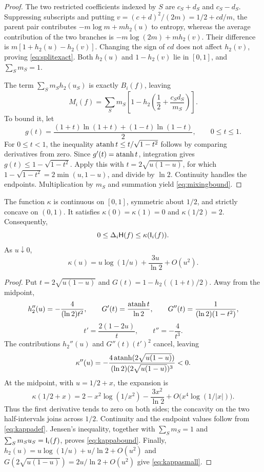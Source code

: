 \begin{proof}
The two restricted coefficients indexed by $S$ are $c_S+d_S$ and
$c_S-d_S$. Suppressing subscripts and putting
$v=(c+d)^2/(2m)=1/2+cd/m$, the parent pair contributes
$-m\log m+mh_2(u)$ to entropy, whereas the average contribution
of the two branches is $-m\log(2m)+mh_2(v)$.
Their difference is $m[1+h_2(u)-h_2(v)]$.
Changing the sign of $cd$ does not affect $h_2(v)$, proving
\eqref{eq:splitexact}. Both $h_2(u)$ and $1-h_2(v)$ lie in $[0,1]$,
and $\sum_Sm_S=1$.

The term $\sum_Sm_Sh_2(u_S)$ is exactly $B_i(f)$, leaving
\[
 M_i(f)=\sum_Sm_S
 \left[1-h_2\!\left(\frac12+\frac{c_Sd_S}{m_S}\right)\right].
\]
To bound it, let
\[
 g(t)=\frac{(1+t)\ln(1+t)+(1-t)\ln(1-t)}2,
 \qquad 0\le t\le1.
\]
For $0\le t<1$, the inequality
$\operatorname{atanh} t\le t/\sqrt{1-t^2}$ follows by comparing derivatives
from zero. Since $g'(t)=\operatorname{atanh} t$, integration gives
$g(t)\le1-\sqrt{1-t^2}$. Apply this with
$t=2\sqrt{u(1-u)}$, for which
$1-\sqrt{1-t^2}=2\min(u,1-u)$, and divide by $\ln2$.
Continuity handles the endpoints. Multiplication by $m_S$ and
summation yield \eqref{eq:mixingbound}.
\end{proof}

\begin{lemma}\label{lem:kappaconcavity}
The function $\kappa$ is continuous on $[0,1]$, symmetric about
$1/2$, and strictly concave on $(0,1)$. It satisfies
$\kappa(0)=\kappa(1)=0$ and $\kappa(1/2)=2$.
Consequently,
\begin{equation}\label{eq:kappabound}
 0\le\Delta_i\mathsf H(f)\le\kappa(\mathsf I_i(f)).
\end{equation}
As $u\downarrow0$,
\begin{equation}\label{eq:kappasmall}
 \kappa(u)=u\log(1/u)+\frac{3u}{\ln2}+O(u^2).
\end{equation}
\end{lemma}

\begin{proof}
Put $t=2\sqrt{u(1-u)}$ and
$G(t)=1-h_2((1+t)/2)$. Away from the midpoint,
\[
 h_2''(u)=-\frac4{(\ln2)t^2},\qquad
 G'(t)=\frac{\operatorname{atanh} t}{\ln2},\qquad
 G''(t)=\frac1{(\ln2)(1-t^2)},
\]
\[
 t'=\frac{2(1-2u)}t,\qquad t''=-\frac4{t^3}.
\]
The contributions $h_2''(u)$ and $G''(t)(t')^2$ cancel, leaving
\begin{equation}\label{eq:kappasecond}
 \kappa''(u)=-
 \frac{4\operatorname{atanh}(2\sqrt{u(1-u)})}
 {(\ln2)(2\sqrt{u(1-u)})^3}<0.
\end{equation}
At the midpoint, with $u=1/2+x$, the expansion is
\[
 \kappa(1/2+x)
 =2-x^2\log(1/x^2)-\frac{3x^2}{\ln2}
       +O\bigl(x^4\log(1/|x|)\bigr).
\]
Thus the first derivative tends to zero on both sides; the
concavity on the two half-intervals joins across $1/2$.
Continuity and the endpoint values follow from
\eqref{eq:kappadef}. Jensen's inequality, together with
$\sum_Sm_S=1$ and $\sum_Sm_Su_S=\mathsf I_i(f)$, proves
\eqref{eq:kappabound}. Finally,
$h_2(u)=u\log(1/u)+u/\ln2+O(u^2)$ and
$G(2\sqrt{u(1-u)})=2u/\ln2+O(u^2)$ give
\eqref{eq:kappasmall}.
\end{proof}

